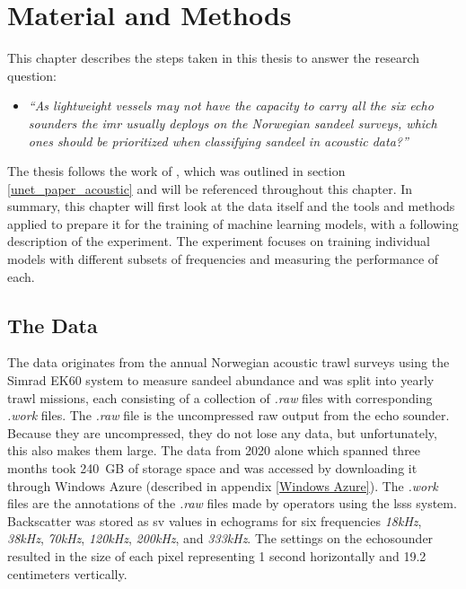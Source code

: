 \chapter{Material and Methods} \label{methods}
    This chapter describes the steps taken in this thesis to answer the research question:
        \begin{itemize}
            \item \textit{“As lightweight vessels may not have the capacity to carry all the six echo sounders the \gls{imr} usually deploys on the Norwegian sandeel surveys, which ones should be prioritized when classifying sandeel in acoustic data?”}
        \end{itemize}
    
    The thesis follows the work of \citeauthor{brautaset2020acoustic}\cite{brautaset2020acoustic}, which was outlined in section \ref{unet_paper_acoustic} and will be referenced throughout this chapter. In summary, this chapter will first look at the data itself and the tools and methods applied to prepare it for the training of machine learning models, with a following description of the experiment. The experiment focuses on training individual models with different subsets of frequencies and measuring the performance of each.
    
    \section{The Data}
        The data originates from the annual Norwegian acoustic trawl surveys using the Simrad EK60 system to measure sandeel abundance and was split into yearly trawl missions, each consisting of a collection of \textit{.raw} files with corresponding \textit{.work} files. The \textit{.raw} file is the uncompressed raw output from the echo sounder. Because they are uncompressed, they do not lose any data, but unfortunately, this also makes them large. The data from 2020 alone which spanned three months took 240 GB of storage space and was accessed by downloading it through Windows Azure (described in appendix \ref{Windows Azure}). The \textit{.work} files are the annotations of the \textit{.raw} files made by operators using the \gls{lsss} system. Backscatter was stored as \gls{sv} values in echograms for six frequencies \textit{18kHz}, \textit{38kHz}, \textit{70kHz}, \textit{120kHz}, \textit{200kHz}, and \textit{333kHz}. The settings on the echosounder resulted in the size of each pixel representing 1 second horizontally and 19.2 centimeters vertically\cite{choi2021semi}.
    

